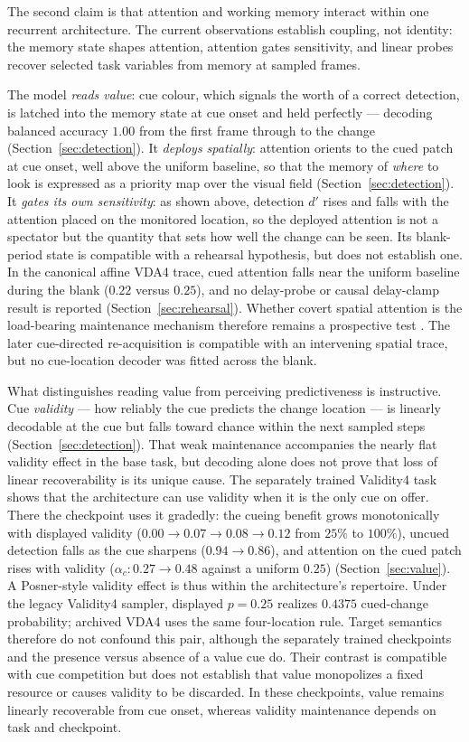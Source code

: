 The second claim is that attention and working memory interact within one recurrent
architecture. The current observations establish coupling, not identity: the memory
state shapes attention, attention gates sensitivity, and linear probes recover selected
task variables from memory at sampled frames.

The model \emph{reads value}: cue colour, which signals the worth of a
correct detection, is latched into the memory state at cue onset and
held perfectly --- decoding balanced accuracy $1.00$ from the first
frame through to the change (Section~\ref{sec:detection}). It
\emph{deploys spatially}: attention orients to the cued patch at cue
onset, well above the uniform baseline, so that the memory of \emph{where}
to look is expressed as a priority map over the visual field
(Section~\ref{sec:detection}). It \emph{gates its own sensitivity}: as
shown above, detection $d'$ rises and falls with the attention placed on
the monitored location, so the deployed attention is not a spectator but
the quantity that sets how well the change can be seen. Its blank-period state is
compatible with a rehearsal hypothesis, but does not establish one. In the canonical
affine VDA4 trace, cued attention falls near the uniform baseline during the blank
($0.22$ versus $0.25$), and no delay-probe or causal delay-clamp result is reported
(Section~\ref{sec:rehearsal}). Whether covert spatial attention is the load-bearing
maintenance mechanism therefore remains a prospective test
\cite{awh_vogel_oh2006,baddeley1992working}. The later cue-directed re-acquisition is
compatible with an intervening spatial trace, but no cue-location decoder was fitted
across the blank.

What distinguishes reading value from perceiving predictiveness is
instructive. Cue \emph{validity} --- how reliably the cue predicts the
change location --- is linearly decodable at the cue but falls toward
chance within the next sampled steps (Section~\ref{sec:detection}). That
weak maintenance accompanies the nearly flat validity effect in the base
task, but decoding alone does not prove that loss of linear recoverability
is its unique cause. The separately trained Validity4 task shows that the
architecture can use validity when it is the only cue on offer. There the
checkpoint uses it gradedly: the cueing benefit grows monotonically with displayed
validity ($0.00 \to 0.07 \to 0.08 \to 0.12$ from $25\%$ to $100\%$),
uncued detection falls as the cue sharpens ($0.94 \to 0.86$), and
attention on the cued patch rises with validity ($\alpha_c: 0.27 \to
0.48$ against a uniform $0.25$) (Section~\ref{sec:value}). A Posner-style
validity effect \cite{posner1980_orienting} is thus within the
architecture's repertoire. Under the legacy Validity4 sampler, displayed $p=0.25$
realizes $0.4375$ cued-change probability; archived VDA4 uses the same four-location
rule. Target semantics therefore do not confound this pair, although the separately
trained checkpoints and the presence versus absence of a value cue do. Their
contrast is compatible with cue competition but does not
establish that value monopolizes a fixed resource or causes validity to
be discarded. In these checkpoints, value remains linearly recoverable
from cue onset, whereas validity maintenance depends on task and
checkpoint.

